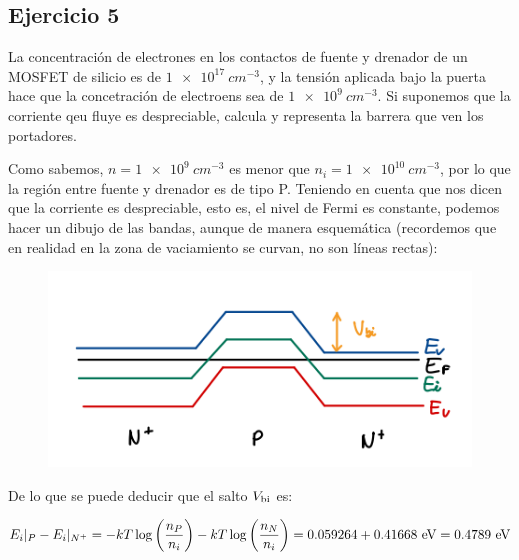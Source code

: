 \vspace*{2em}

\begin{Enunciado}
	\subsection*{Ejercicio 5}
	La concentración de electrones en los contactos de fuente y drenador de un MOSFET de silicio es de $\SI{1e+17}{cm^{-3}}$, y la tensión aplicada bajo la puerta hace que la concetración de electroens sea de $\SI{1e+9}{cm^{-3}}$. Si suponemos que la corriente qeu fluye es despreciable, calcula y representa la barrera que ven los portadores. 
\end{Enunciado}

\vspace*{1em}

	Como sabemos, $n=\SI{1e+9}{cm^{-3}}$ es menor que $n_i =\SI{1e+10}{cm^{-3}}$, por lo que la región entre fuente y drenador es de tipo P. Teniendo en cuenta que nos dicen que la corriente es despreciable, esto es, el nivel de Fermi es constante, podemos hacer un dibujo de las bandas, aunque de manera esquemática (recordemos que en realidad en la zona de vaciamiento se curvan,  no son líneas rectas):

\begin{figure}[H] \centering
	\includegraphics[width=0.45\linewidth]{Ejercicios/Ch_05/Ej_05.png} \hfill
\end{figure}

	De lo que se puede deducir que el salto $V_{\text{bi}}$ es:

	\begin{equation}
		E_i|_P - E_i|_{N^+} =  - kT \log \left( \frac{n_P}{n_i} \right) - kT  \log \left( \frac{n_N}{n_i} \right)  = 0.059264 + 0.41668 \ \text{eV} = 0.4789 \ \text{eV} 
	\end{equation}


\vspace*{2em}



